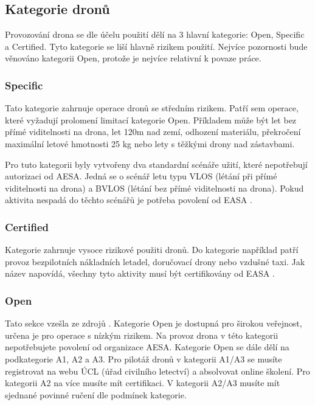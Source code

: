 \subsection{Kategorie dronů}
Provozování drona se dle účelu použití dělí na 3 hlavní kategorie: Open, Specific a Certified. Tyto kategorie se liší hlavně rizikem použití. Nejvíce pozornosti bude věnováno kategorii Open, protože je nejvíce relativní k povaze práce.

\subsubsection{Specific}
Tato kategorie zahrnuje operace dronů se středním rizikem. Patří sem operace, které vyžadují prolomení limitací kategorie Open. Příkladem může být let bez přímé viditelnosti na drona, let 120m nad zemí, odhození materiálu, překročení maximální letové hmotnosti 25 kg nebo lety s těžkými drony nad zástavbami\cite{EASA:SpecificCategory}. 
    
Pro tuto kategorii byly vytvořeny dva standardní scénáře užití, které nepotřebují autorizaci od AESA. Jedná se o scénář letu typu VLOS (létání při přímé viditelnosti na drona) a BVLOS (létání bez přímé viditelnosti na drona). Pokud aktivita nespadá do těchto scénářů je potřeba povolení od EASA \cite{DroneKatogorySouhrn,EASA:SpecificCategory}.  
    

\subsubsection{Certified} 
Kategorie zahrnuje vysoce rizikové použiti dronů. Do kategorie například patří provoz bezpilotních nákladních letadel, doručovací drony nebo vzdušné taxi. Jak název napovídá, všechny tyto aktivity musí být certifikovány od EASA \cite{EASA:CertifiedCategory}.

\subsubsection{Open} 
Tato sekce vzešla ze zdrojů \cite{EASA:openSouhrn2024,AlzaDronyKategorie,DroneKatogorySouhrn}. Kategorie Open je dostupná pro širokou veřejnost, určena je pro operace s nízkým rizikem. Na provoz drona v této kategorii nepotřebujete povolení od organizace AESA. Kategorie Open se dále dělí na podkategorie A1, A2 a A3. Pro pilotáž dronů v kategorii A1/A3 se musíte registrovat na webu ÚCL (úřad civilního letectví) a absolvovat online školení. Pro kategorii A2 na více musíte mít certifikaci. V kategorii A2/A3 musíte mít sjednané povinné ručení dle podmínek kategorie.


